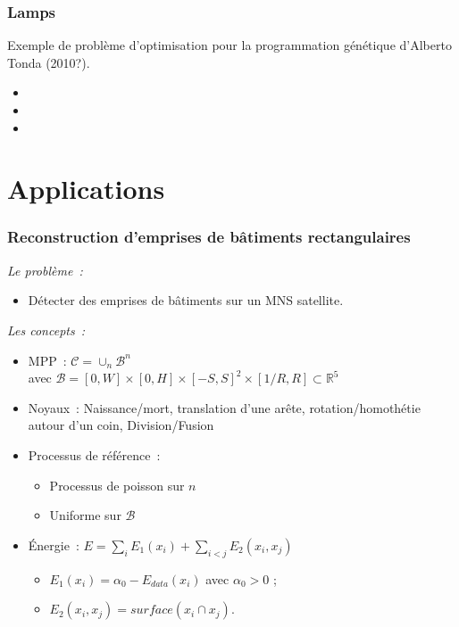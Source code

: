 \documentclass{beamer}
\begin{document}
\begin{frame}
\frametitle{Lamps}
Exemple de problème d'optimisation pour la programmation génétique d'Alberto Tonda (2010?).
\begin{itemize}
\item 
\item 
\item 
\end{itemize}
\end{frame}

\section{Applications}

\begin{frame}
\frametitle{Reconstruction d'emprises de bâtiments rectangulaires}
\emph{Le probl\`eme~:} 
\begin{itemize}
\item Détecter des emprises de bâtiments sur un MNS satellite.
\end{itemize}
\emph{Les concepts~:}
\begin{itemize}
\item MPP~:  $\mathcal{C} = \cup_{n}\mathcal{B}^n$\\
avec $\mathcal{B}=[0,W]\times[0,H]\times[-S,S]^2\times[1/R,R] \subset  \mathds{R}^{5}$
\item Noyaux~: Naissance/mort, translation d'une arête, rotation/homothétie autour d'un coin, Division/Fusion
\item Processus de référence~:
\begin{itemize}
\item Processus de poisson sur $n$
\item Uniforme sur $\mathcal{B}$
\end{itemize}
\item \'Energie~: $E = \sum_i E_1(x_i) + \sum_{i<j} E_2(x_i,x_j)$
\begin{itemize}
\item $E_1(x_i)=\alpha_{0} - E_{data}(x_i)$ avec $\alpha_{0}>0$ ;
\item $E_2(x_i,x_j) = surface(x_i \cap x_j)$.
\end{itemize}
\end{itemize}
\end{frame}
\end{document}
